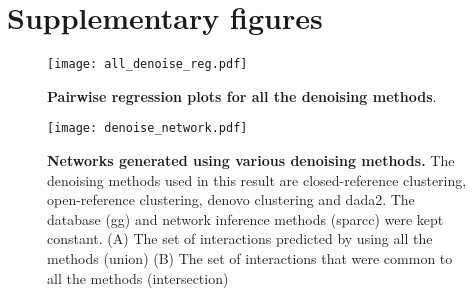 
\section*{Supplementary figures}

  \renewcommand{\thefigure}{S\arabic{figure}}
  \setcounter{figure}{0}

  \begin{figure}[h!]
    \centering
    \texttt{[image: all\_denoise\_reg.pdf]}
    \caption{
      \textbf{Pairwise regression plots for all the denoising methods}.
    }
    \label{fig:all_denoise_reg}
  \end{figure}

  \begin{figure}[h!]
    \centering
    \texttt{[image: denoise\_network.pdf]}
    \caption{
      \textbf{Networks generated using various denoising methods.}
      The denoising methods used in this result are closed-reference clustering, open-reference clustering, denovo clustering and \ac{dada2}.
      The database (\ac{gg}) and network inference methods (\ac{sparcc}) were kept constant.
      (A) The set of interactions predicted by using all the methods (union)
      (B) The set of interactions that were common to all the methods (intersection)
    }
    \label{fig:denoise_network}
  \end{figure}



